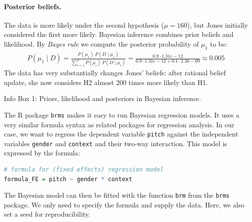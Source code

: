 \documentclass[nobib]{tufte-handout}
\begin{document}
\begin{InfoBox}[]
{\begin{minipage}{1.0\textwidth}
     \paragraph{Posterior beliefs.} The data is more likely under the second hypothesis ($\mu = 160$), but Jones initially considered the first more likely. Bayesian inference combines prior beliefs and likelihood. By \emph{Bayes rule} we compute the posterior probability of $\mu_1$ to be:
     \begin{align*}
       P(\mu_1 \mid D) = \frac{P(\mu_1) \ P(D \mid \mu_1)}{ \sum_{i =1}^2 P(\mu_i) \ P(D \mid \mu_i)} = \frac{0.9 \cdot 1.31e-12}{ 0.9 \cdot 1.31e-12 + 0.1 \cdot 2.38-09} \approx 0.005
     \end{align*}
     The data has very substantially changes Jones' beliefs: after rational belief update, she now considers H2 almost 200 times more likely than H1.
     
  \end{minipage} \par
  } \par
  \begin{center}
    Info Box 1: Priors, likelihood and posteriors in Bayesian inference.
  \end{center}
\end{InfoBox}


The R package \texttt{brms} \citep{buerkner2016brms} makes it easy to run Bayesian regression models. It uses a very similar formula syntax as related packages for regression analysis. In our case, we want to regress the dependent variable \texttt{pitch} against the independent variables \texttt{gender} and \texttt{context} and their two-way interaction. This model is expressed by the formula:

\bigskip

\begin{minipage}[]{\textwidth}
\begin{lstlisting}[language=R]
# formula for (fixed effects) regression model
formula_FE = pitch ~ gender * context
\end{lstlisting}
\end{minipage}

The Bayesian model can then be fitted with the function \texttt{brm} from the \texttt{brms} package. We only need to specify the formula and supply the data. Here, we also set a seed for reproducibility.
\end{document}

